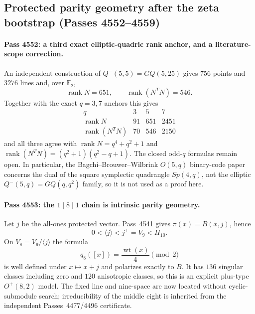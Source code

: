 \subsection{Protected parity geometry after the zeta bootstrap (Passes 4552--4559)}
\label{sec:pass4552-4559-rank-filtration-shells}

\paragraph{Pass 4552: a third exact elliptic-quadric rank anchor, and a literature-scope correction.}
An independent construction of $Q^-(5,5)=GQ(5,25)$ gives $756$ points and
$3276$ lines and, over $\mathbb F_2$,
\[
 \operatorname{rank}N=651,\qquad \operatorname{rank}(N^TN)=546.
\]
Together with the exact $q=3,7$ anchors this gives
\[
\begin{array}{c|ccc}q&3&5&7\\\hline
\operatorname{rank}N&91&651&2451\\
\operatorname{rank}(N^TN)&70&546&2150
\end{array}
\]
and all three agree with
$\operatorname{rank}N=q^4+q^2+1$ and
$\operatorname{rank}(N^TN)=(q^2+1)(q^2-q+1)$.  The closed odd-$q$ formulas
remain open.  In particular, the Bagchi--Brouwer--Wilbrink $O(5,q)$ binary-code
paper concerns the dual of the square symplectic quadrangle $Sp(4,q)$, not the
elliptic $Q^-(5,q)=GQ(q,q^2)$ family, so it is not used as a proof here.

\paragraph{Pass 4553: the $1\mid8\mid1$ chain is intrinsic parity geometry.}
Let $j$ be the all-ones protected vector.  Pass~4541 gives
$\pi(x)=B(x,j)$, hence
\[
 \boxed{0<\langle j\rangle<j^\perp=V_9<H_{10}}.
\]
On $V_8=V_9/\langle j\rangle$ the formula
\[
 \boxed{q_8([x])=\frac{\operatorname{wt}(x)}4\pmod2}
\]
is well defined under $x\mapsto x+j$ and polarizes exactly to $B$.  It has
$136$ singular classes including zero and $120$ anisotropic classes, so this is
an explicit plus-type $O^+(8,2)$ model.  The fixed line and nine-space are now
located without cyclic-submodule search; irreducibility of the middle eight is
inherited from the independent Passes~4477/4496 certificate.

